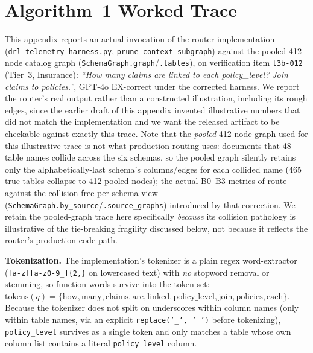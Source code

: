 \documentclass[twocolumn]{svjour3}
\begin{document}
\section{Algorithm~1 Worked Trace}
\label{sec:router-trace}

This appendix reports an actual invocation of the router implementation (\texttt{drl\_telemetry\_harness.py}, \texttt{prune\_context\_subgraph}) against the pooled 412-node catalog graph (\texttt{SchemaGraph.graph}/\texttt{.tables}), on verification item \texttt{t3b-012} (Tier~3, Insurance): \emph{``How many claims are linked to each policy\_level? Join claims to policies.''}, GPT-4o EX-correct under the corrected harness.
We report the router's real output rather than a constructed illustration, including its rough edges, since the earlier draft of this appendix invented illustrative numbers that did not match the implementation and we want the released artifact to be checkable against exactly this trace.
Note that the \emph{pooled} 412-node graph used for this illustrative trace is not what production routing uses:  documents that 48 table names collide across the six schemas, so the pooled graph silently retains only the alphabetically-last schema's columns/edges for each collided name (465 true tables collapse to 412 pooled nodes); the actual B0--B3 metrics of  route against the collision-free per-schema view (\texttt{SchemaGraph.by\_source}/\texttt{.source\_graphs}) introduced by that correction. We retain the pooled-graph trace here specifically \emph{because} its collision pathology is illustrative of the tie-breaking fragility discussed below, not because it reflects the router's production code path.

\textbf{Tokenization.} The implementation's tokenizer is a plain regex word-extractor (\texttt{[a-z][a-z0-9\_]\{2,\}} on lowercased text) with \emph{no} stopword removal or stemming, so function words survive into the token set: $\text{tokens}(q) = \{\text{how}, \text{many}, \text{claims}, \text{are}, \text{linked}, \text{policy\_level}, \text{join}, \text{policies}, \text{each}\}$.
Because the tokenizer does not split on underscores within column names (only within table names, via an explicit \texttt{replace('\_',\ ' ')} before tokenizing), \texttt{policy\_level} survives as a single token and only matches a table whose own column list contains a literal \texttt{policy\_level} column.
\end{document}
